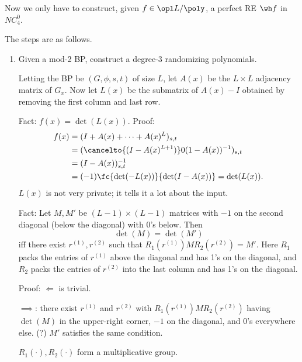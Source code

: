 Now we only have to construct, given $f\in \opl L/\poly$, a perfect RE $\wh f$ in $NC_4^0$.

The steps are as follows.
\begin{enumerate}
\item
Given a mod-2 BP, construct a degree-3 randomizing polynomials.

Letting the BP be $(G,\phi,s,t)$ of size $L$, let $A(x)$ be the $L\times L$ adjacency matrix of $G_x$. 
Now let $L(x)$ be the submatrix of $A(x)-I$ obtained by removing the first column and last row.

Fact: $f(x)=\det(L(x))$. 
Proof: 
\begin{align*}
f(x)&=(I+A(x)+\cdots +A(x)^L)_{s,t}\\
&=(\cancelto{(I-A(x)^{L+1})}0(1-A(x))^{-1})_{s,t}\\
&=(I-A(x))^{-1}_{s,t} \\
&=(-1)\fc{\det(-L(x))}{\det(I-A(x))} = \det(L(x)).
\end{align*}
$L(x)$ is not very private; it tells it a lot about the input.

Fact: Let $M,M'$ be $(L-1)\times (L-1)$ matrices with $-1$ on the second diagonal (below the diagonal) with 0's below. Then 
\[
\det(M)=\det(M')
\]
iff there exist $r^{(1)},r^{(2)}$ such that $R_1(r^{(1)}) M R_2(r^{(2)}) = M'$.
Here $R_1$ packs the entries of $r^{(1)}$ above the diagonal and has 1's on the diagonal, and $R_2$ packs the entries of $r^{(2)}$ into the last column and has 1's on the diagonal.

Proof: $\Leftarrow$ is trivial.

$\implies$: there exist $r^{(1)}$ and $r^{(2)}$ with $R_1(r^{(1)})MR_2(r^{(2)})$ having $\det(M)$ in the upper-right corner, $-1$ on the diagonal, and $0$'s everywhere else. (?) $M'$  satisfies the same condition.

$R_1(\cdot),R_2(\cdot)$ form a multiplicative group.


\end{enumerate}
